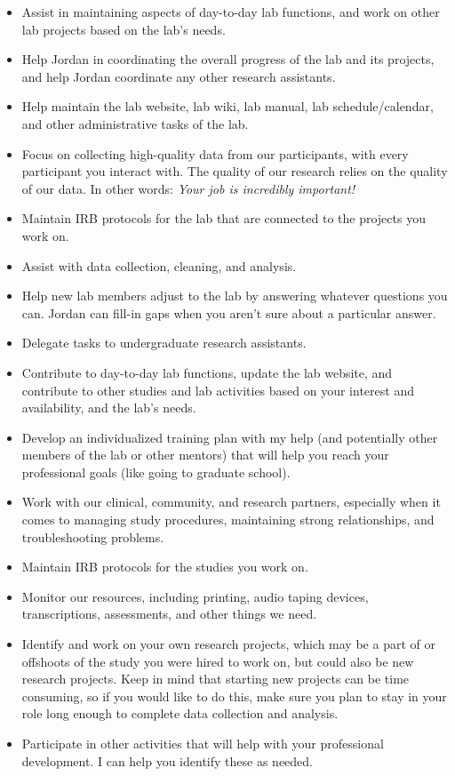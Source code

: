 \documentclass[
]{book}
\begin{document}
\begin{itemize}
\item
  Assist in maintaining aspects of day-to-day lab functions, and work on other lab projects based on
  the lab's needs.
\item
  Help Jordan in coordinating the overall progress of the lab and its projects, and help Jordan coordinate any other research assistants.
\item
  Help maintain the lab website, lab wiki, lab manual, lab schedule/calendar, and other administrative tasks of the lab.
\item
  Focus on collecting high-quality data from our participants, with every participant you interact with. The quality of our research relies on the quality of our data. In other words: \emph{Your job is incredibly important!}
\item
  Maintain IRB protocols for the lab that are connected to the projects you work on.
\item
  Assist with data collection, cleaning, and analysis.
\item
  Help new lab members adjust to the lab by answering whatever questions you can. Jordan can fill-in gaps when you aren't sure about a particular answer.
\item
  Delegate tasks to undergraduate research assistants.
\item
  Contribute to day-to-day lab functions, update the lab website, and contribute to other studies and lab activities based on your interest and availability, and the lab's needs.
\item
  Develop an individualized training plan with my help (and potentially other members of the lab or other mentors) that will help you reach your professional goals (like going to graduate school).
\item
  Work with our clinical, community, and research partners, especially when it comes to managing study procedures, maintaining strong relationships, and troubleshooting problems.
\item
  Maintain IRB protocols for the studies you work on.
\item
  Monitor our resources, including printing, audio taping devices, transcriptions, assessments, and other things we need.
\item
  Identify and work on your own research projects, which may be a part of or offshoots of the study you were hired to work on, but could also be new research projects. Keep in mind that starting new projects can be time consuming, so if you would like to do this, make sure you plan to stay in your role long enough to complete data collection and analysis.
\item
  Participate in other activities that will help with your professional development. I can help you identify these as needed.
\end{itemize}
\end{document}
